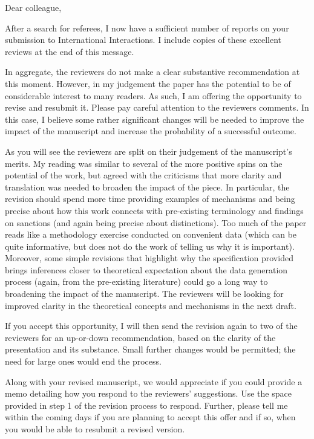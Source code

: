 Dear colleague,

After a search for referees, I now have a sufficient number of reports on your submission to International Interactions. I include copies of these excellent reviews at the end of this message.

In aggregate, the reviewers do not make a clear substantive recommendation at this moment. However, in my judgement the paper has the potential to be of considerable interest to many readers. As such, I am offering the opportunity to revise and resubmit it. Please pay careful attention to the reviewers comments. In this case, I believe some rather significant changes will be needed to improve the impact of the manuscript and increase the probability of a successful outcome.

As you will see the reviewers are split on their judgement of the manuscript's merits. My reading was similar to several of the more positive spins on the potential of the work, but agreed with the criticisms that more clarity and translation was needed to broaden the impact of the piece. In particular, the revision should spend more time providing examples of mechanisms and being precise about how this work connects with pre-existing terminology and findings on sanctions (and again being precise about distinctions). Too much of the paper reads like a methodology exercise conducted on convenient data (which can be quite informative, but does not do the work of telling us why it is important). Moreover, some simple revisions that highlight why the specification provided brings inferences closer to theoretical expectation about the data generation process (again, from the pre-existing literature) could go a long way to broadening the impact of the manuscript. The reviewers will be looking for improved clarity in the theoretical concepts and mechanisms in the next draft.

If you accept this opportunity, I will then send the revision again to two of the reviewers for an up-or-down recommendation, based on the clarity of the presentation and its substance. Small further changes would be permitted; the need for large ones would end the process.

Along with your revised manuscript, we would appreciate if you could provide a memo detailing how you respond to the reviewers' suggestions. Use the space provided in step 1 of the revision process to respond. Further, please tell me within the coming days if you are planning to accept this offer and if so, when you would be able to resubmit a revised version.

